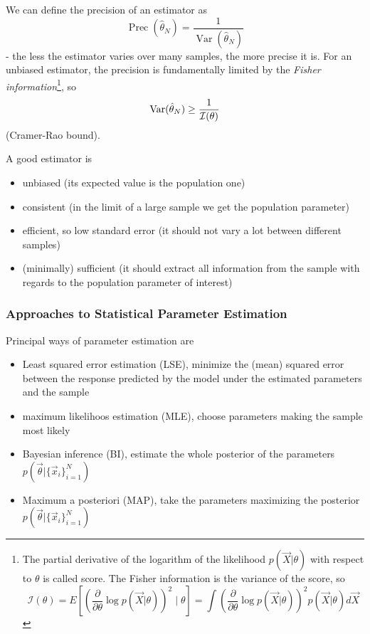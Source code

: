 We can define the precision of an estimator as
\begin{equation}
    \operatorname{Prec}(\hat{\theta}_N) = \frac{1}{\operatorname{Var}(\hat{\theta}_N)}
\end{equation}
- the less the estimator varies over many samples, the more precise it is. For an
unbiased estimator, the precision is fundamentally limited by the \textit{Fisher information}\footnote{
    The partial derivative of the logarithm of the likelihood $p(\vec{X} | \theta)$ with respect to $\theta$ is called score.
    The Fisher information is the variance of the score, so
    \begin{equation}
        \mathcal{I}(\theta) = E\left[ \left( \frac{\partial}{\partial \theta} \log p(\vec{X} | \theta) \right)^2 \mid \theta \right] = \int \left( \frac{\partial}{\partial \theta} \log p(\vec{X} | \theta) \right)^2 p(\vec{X} | \theta) d\vec{X}
    \end{equation}
}, so
\begin{equation}
    \operatorname{Var}(\hat{\theta}_N) \geq \frac{1}{\mathcal{I}(\theta)}
\end{equation}
(Cramer-Rao bound).

A good estimator is
\begin{itemize}
    \item unbiased (its expected value is the population one)
    \item consistent (in the limit of a large sample we get the population parameter)
    \item efficient, so low standard error (it should not vary a lot between different samples)
    \item (minimally) sufficient (it should extract all information from the sample with regards to the population parameter of interest)
\end{itemize}

\subsubsection{Approaches to Statistical Parameter Estimation}

Principal ways of parameter estimation are
\begin{itemize}
    \item Least squared error estimation (LSE), minimize the (mean) squared error between the response predicted by the model under the estimated parameters and the sample
    \item maximum likelihoos estimation (MLE), choose parameters making the sample most likely
    \item Bayesian inference (BI), estimate the whole posterior of the parameters $p(\vec{\theta}|\{\vec{x}_i\}_{i=1}^N)$
    \item Maximum a posteriori (MAP), take the parameters maximizing the posterior $p(\vec{\theta}|\{\vec{x}_i\}_{i=1}^N)$
\end{itemize}

